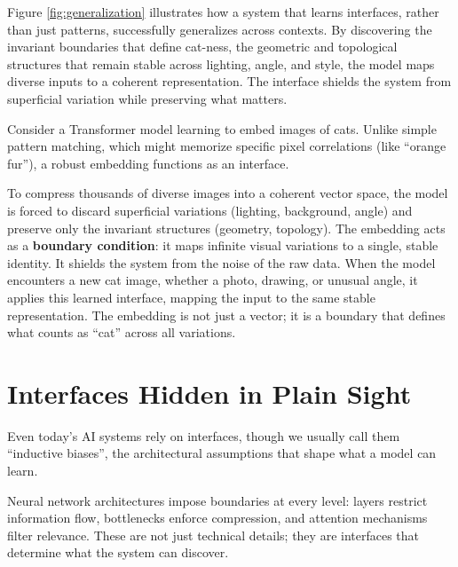 \documentclass[
  openright]{book}
\begin{document}
Figure \ref{fig:generalization} illustrates how a system that learns
interfaces, rather than just patterns, successfully generalizes across
contexts. By discovering the invariant boundaries that define cat-ness,
the geometric and topological structures that remain stable across
lighting, angle, and style, the model maps diverse inputs to a coherent
representation. The interface shields the system from superficial
variation while preserving what matters.

Consider a Transformer model learning to
embed images of cats. Unlike simple pattern matching,
which might memorize specific pixel correlations (like ``orange fur''),
a robust embedding functions as an interface.

To compress thousands of diverse images into a coherent vector space,
the model is forced to discard superficial variations (lighting,
background, angle) and preserve only the invariant structures (geometry,
topology). The embedding acts as a
\textbf{boundary condition}: it maps infinite
visual variations to a single, stable identity. It shields the system
from the noise of the raw data. When the model encounters a new cat
image, whether a photo, drawing, or unusual angle, it applies this
learned interface, mapping the input to the same stable representation.
The embedding is not just a vector; it is a boundary that defines what
counts as ``cat'' across all variations.

\section{Interfaces Hidden in Plain
Sight}\label{interfaces-hidden-in-plain-sight}

Even today's AI systems rely on interfaces, though we usually call them
``inductive biases'', the architectural
assumptions that shape what a model can learn.

Neural network architectures impose boundaries at
every level: layers restrict information flow, bottlenecks enforce
compression, and attention mechanisms filter
relevance. These are not just technical details; they are interfaces
that determine what the system can discover.
\end{document}
